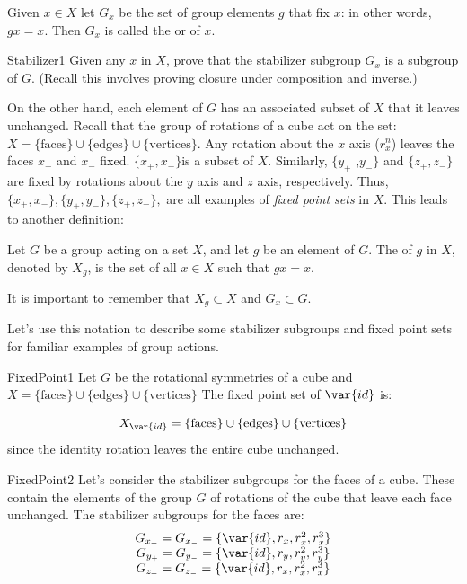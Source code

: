 \begin {defn}\label {StabilizerSubgroups} 
Given $x \in X$ let $G_x$ be the set of  group elements $g$ that fix $x$:  in other words, $gx=x$.  Then $G_x$ is called the  or  of $x$.
\end{defn}

\begin {exercise}{Stabilizer1}
Given any $x$ in $X$, prove that the stabilizer subgroup $G_x$  is a subgroup of $G$.  (Recall this involves proving closure under composition and inverse.)
\end {exercise}

On the other hand, each element of $G$ has an associated subset of $X$ that it leaves unchanged. 
Recall that the group of rotations of a cube act on the set:   $X=\{\text{faces}\}\cup\{\text{edges}\}\cup\{\text{vertices}\}$.  Any rotation about the $x$ axis ($r_x^n$) leaves the faces $x_+$ and $x_-$ fixed.   $\{x_+,x_-\}$is a subset of $X$. Similarly, $\{y_+$ ,$y_-\}$ and $\{z_+,z_-\}$ are  fixed by rotations about the $y$ axis and $z$ axis, respectively.   Thus, $\{x_+,x_-\},\{y_+,y_-\},\{z_+,z_-\},$  are all examples of \emph{fixed point sets} in $X$.
This leads to another definition:

\begin{defn} \label {FixedPoint}
Let $G$ be a group acting on a set $X$, and let $g$ be
an element of $G$. The  of $g$ in $X$, denoted by $X_g$, is the set of 
all $x \in X$ such that $gx = x$.
\end{defn}
\noindent
It is important to remember that $X_g \subset X$ and $G_x \subset G$. 

Let's use this notation to describe some stabilizer subgroups and fixed point sets for familiar examples of group actions.

\begin {example}{FixedPoint1}
Let $G$ be the rotational symmetries of a cube and $X=\{\text{faces}\}\cup\{\text{edges}\}\cup\{\text{vertices}\}$
The fixed point set of $\var{id}$ is: 

$$X_{\var{id}}=\{\text{faces}\}\cup\{\text{edges}\}\cup\{\text{vertices}\}$$
since the identity rotation  leaves the entire cube unchanged.  
\end {example}

\begin {example}{FixedPoint2}
Let's consider the stabilizer subgroups for the faces of a cube.  These contain the elements of the group $G$ of rotations of the cube that leave each face unchanged.  The stabilizer subgroups for the faces are:
$$\begin {array} {c}
G_{x_+}=G_{x_-}=\{\var{id},r_x,r_x^2,r_x^3\}\\
G_{y_+}=G_{y_-}=\{\var{id},r_y,r_y^2,r_y^3\}\\
G_{z_+}=G_{z_-}=\{\var{id},r_x,r_x^2,r_x^3\}
\end {array}$$
\end{example}

